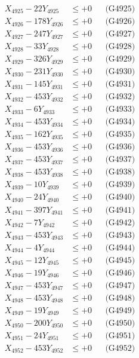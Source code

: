 \documentclass[a4paper,10pt]{article}
\begin{document}
{\begin{align}
X_{4925} - 22Y_{4925} &\leq +0 && \text{(G4925)} \\
X_{4926} - 178Y_{4926} &\leq +0 && \text{(G4926)} \\
X_{4927} - 247Y_{4927} &\leq +0 && \text{(G4927)} \\
X_{4928} - 33Y_{4928} &\leq +0 && \text{(G4928)} \\
X_{4929} - 326Y_{4929} &\leq +0 && \text{(G4929)} \\
X_{4930} - 231Y_{4930} &\leq +0 && \text{(G4930)} \\
\allowbreak
X_{4931} - 145Y_{4931} &\leq +0 && \text{(G4931)} \\
X_{4932} - 453Y_{4932} &\leq +0 && \text{(G4932)} \\
X_{4933} - 6Y_{4933} &\leq +0 && \text{(G4933)} \\
X_{4934} - 453Y_{4934} &\leq +0 && \text{(G4934)} \\
X_{4935} - 162Y_{4935} &\leq +0 && \text{(G4935)} \\
X_{4936} - 453Y_{4936} &\leq +0 && \text{(G4936)} \\
X_{4937} - 453Y_{4937} &\leq +0 && \text{(G4937)} \\
X_{4938} - 453Y_{4938} &\leq +0 && \text{(G4938)} \\
X_{4939} - 10Y_{4939} &\leq +0 && \text{(G4939)} \\
X_{4940} - 24Y_{4940} &\leq +0 && \text{(G4940)} \\
\allowbreak
X_{4941} - 397Y_{4941} &\leq +0 && \text{(G4941)} \\
X_{4942} - 7Y_{4942} &\leq +0 && \text{(G4942)} \\
X_{4943} - 453Y_{4943} &\leq +0 && \text{(G4943)} \\
X_{4944} - 4Y_{4944} &\leq +0 && \text{(G4944)} \\
X_{4945} - 12Y_{4945} &\leq +0 && \text{(G4945)} \\
X_{4946} - 19Y_{4946} &\leq +0 && \text{(G4946)} \\
X_{4947} - 453Y_{4947} &\leq +0 && \text{(G4947)} \\
X_{4948} - 453Y_{4948} &\leq +0 && \text{(G4948)} \\
X_{4949} - 19Y_{4949} &\leq +0 && \text{(G4949)} \\
X_{4950} - 200Y_{4950} &\leq +0 && \text{(G4950)} \\
\allowbreak
X_{4951} - 24Y_{4951} &\leq +0 && \text{(G4951)} \\
X_{4952} - 453Y_{4952} &\leq +0 && \text{(G4952)} \\

\end{align}}
\end{document}
